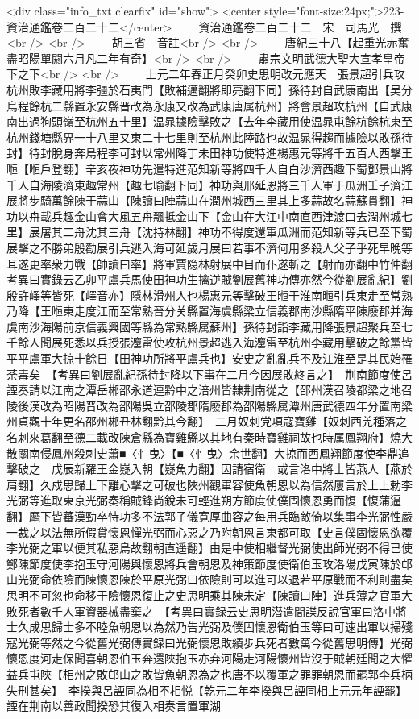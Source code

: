 <div class="info_txt clearfix" id="show">
<center style="font-size:24px;">223-資治通鑑卷二百二十二</center>
  　　資治通鑑卷二百二十二　宋　司馬光　撰<br />
<br />
　　胡三省　音註<br />
<br />
　　唐紀三十八【起重光赤奮盡昭陽單閼六月凡二年有奇】<br />
<br />
　　肅宗文明武德大聖大宣孝皇帝下之下<br />
<br />
　　上元二年春正月癸卯史思明改元應天　張景超引兵攻杭州敗李藏用將李彊於石夷門【敗補邁翻將即亮翻下同】孫待封自武康南出【吴分烏程餘杭二縣置永安縣晋改為永康又改為武康唐属杭州】將會景超攻杭州【自武康南出過狗頭嶺至杭州五十里】温晁據險擊敗之【去年李藏用使温晁屯餘杭餘杭東至杭州錢塘縣界一十八里又東二十七里則至杭州此陸路也故温晁得趨而據險以敗孫待封】待封脫身奔烏程李可封以常州降丁未田神功使特進楊惠元等將千五百人西擊王暅【暅戶登翻】辛亥夜神功先遣特進范知新等將四千人自白沙濟西趣下蜀鄧景山將千人自海陵濟東趣常州【趣七喻翻下同】神功與邢延恩將三千人軍于瓜洲壬子濟江展將步騎萬餘陳于蒜山【陳讀曰陣蒜山在潤州城西三里其上多蒜故名蒜蘇貫翻】神功以舟載兵趣金山會大風五舟飄抵金山下【金山在大江中南直西津渡口去潤州城七里】展屠其二舟沈其三舟【沈持林翻】神功不得度還軍瓜洲而范知新等兵已至下蜀展擊之不勝弟殷勸展引兵逃入海可延歲月展曰若事不濟何用多殺人父子乎死早晩等耳遂更率衆力戰【帥讀曰率】將軍賈隐林射展中目而仆遂斬之【射而亦翻中竹仲翻　考異曰實錄云乙卯平盧兵馬使田神功生擒逆賊劉展舊神功傳亦然今從劉展亂紀】劉殷許嶧等皆死【嶧音亦】隱林滑州人也楊惠元等擊破王暅于淮南暅引兵東走至常熟乃降【王暅東走度江而至常熟晉分关縣置海虞縣梁立信義郡南沙縣隋平陳廢郡并海虞南沙海陽前京信義興國等縣為常熟縣属蘇州】孫待封詣李藏用降張景超聚兵至七千餘人聞展死悉以兵授張灋雷使攻杭州景超逃入海灋雷至杭州李藏用擊破之餘黨皆平平盧軍大掠十餘日【田神功所將平盧兵也】安史之亂亂兵不及江淮至是其民始罹荼毒矣　【考異曰劉展亂紀孫待封降以下事在二月今因展敗終言之】　荆南節度使呂諲奏請以江南之潭岳郴邵永道連黔中之涪州皆隸荆南從之【邵州漢召陵都梁之地召陵後漢改為昭陽晋改為邵陽吳立邵陵郡隋廢郡為邵陽縣属潭州唐武德四年分置南梁州貞觀十年更名邵州郴丑林翻黔其今翻】　二月奴刺党項寇寶雞【奴刺西羌種落之名刺來葛翻至德二載改陳倉縣為寶雞縣以其地有秦時寶雞祠故也時属鳳翔府】燒大散關南侵鳳州殺刺史蕭■〈忄曳〉【■〈忄曳〉余世翻】大掠而西鳳翔節度使李鼎追擊破之　戊辰新羅王金嶷入朝【嶷魚力翻】因請宿衛　或言洛中將士皆燕人【燕於肩翻】久戍思歸上下離心擊之可破也陜州觀軍容使魚朝恩以為信然屢言於上上勅李光弼等進取東京光弼奏稱賊鋒尚銳未可輕進朔方節度使僕固懷恩勇而愎【愎蒲逼翻】麾下皆蕃漢勁卒恃功多不法郭子儀寛厚曲容之每用兵臨敵倚以集事李光弼性嚴一裁之以法無所假貸懷恩憚光弼而心惡之乃附朝恩言東都可取【史言僕固懷恩欲覆李光弼之軍以便其私惡烏故翻朝直遥翻】由是中使相繼督光弼使出師光弼不得已使鄭陳節度使李抱玉守河陽與懷恩將兵會朝恩及神策節度使衛伯玉攻洛陽戊寅陳於邙山光弼命依險而陳懷恩陳於平原光弼曰依險則可以進可以退若平原戰而不利則盡矣思明不可忽也命移于險懷恩復止之史思明乘其陳未定【陳讀曰陣】進兵薄之官軍大敗死者數千人軍資器械盡棄之　【考異曰實録云史思明潜遣間諜反說官軍曰洛中將士久成思歸士多不睦魚朝恩以為然乃告光弼及僕固懷恩衛伯玉等曰可速出軍以掃殘寇光弼等然之今從舊光弼傳實録曰光弼懷恩敗績步兵死者數萬今從舊思明傳】光弼懷恩度河走保聞喜朝恩伯玉奔還陜抱玉亦弃河陽走河陽懷州皆沒于賊朝廷聞之大懼益兵屯陜【相州之敗邙山之敗皆魚朝恩為之也唐不以覆軍之罪罪朝恩而罷郭李兵柄失刑甚矣】　李揆與呂諲同為相不相悦【乾元二年李揆與呂諲同相上元元年諲罷】諲在荆南以善政聞揆恐其復入相奏言置軍湖